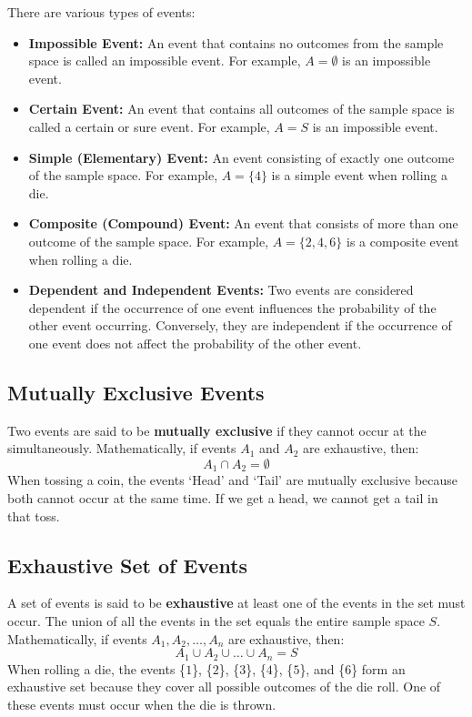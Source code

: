 \documentclass[twoside]{book}
\begin{document}
There are various types of events:
\begin{itemize}
    \item \textbf{Impossible Event:}
    An event that contains no outcomes from the sample space is called an impossible event. For example, $A = \emptyset$ is an impossible event.

    \item \textbf{Certain Event:}
    An event that contains all outcomes of the sample space is called a certain or sure event. For example, $A = S$ is an impossible event.

    \item \textbf{Simple (Elementary) Event:}
    An event consisting of exactly one outcome of the sample space. For example, $A = \{4\}$ is a simple event when rolling a die.

    \item \textbf{Composite (Compound) Event:}
    An event that consists of more than one outcome of the sample space. For example, $A = \{2, 4, 6\}$ is a composite event when rolling a die.

    \item \textbf{Dependent and Independent Events:}
    Two events are considered dependent if the occurrence of one event influences the probability of the other event occurring. Conversely, they are independent if the occurrence of one event does not affect the probability of the other event.
\end{itemize}

    \subsection{Mutually Exclusive Events}
    Two events are said to be \textbf{mutually exclusive} if they cannot occur at the simultaneously. Mathematically, if events $A_1$ and $A_2$ are exhaustive, then:
    \[
    A_1 \cap A_2 = \emptyset
    \]
    When tossing a coin, the events `Head' and `Tail' are mutually exclusive because both cannot occur at the same time. If we get a head, we cannot get a tail in that toss.

    \subsection{Exhaustive Set of Events}
    A set of events is said to be \textbf{exhaustive} at least one of the events in the set must occur. The union of all the events in the set equals the entire sample space $S$. Mathematically, if events $A_1, A_2, \dots, A_n$ are exhaustive, then:
    \[
    A_1 \cup A_2 \cup \dots \cup A_n = S
    \]
    When rolling a die, the events \{$1$\}, \{$2$\}, \{$3$\}, \{$4$\}, \{$5$\}, and \{$6$\} form an exhaustive set because they cover all possible outcomes of the die roll. One of these events must occur when the die is thrown.
\end{document}
